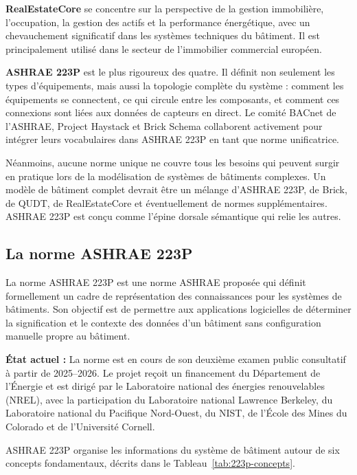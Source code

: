 \textbf{RealEstateCore} se concentre sur la perspective de la gestion immobilière, l'occupation, la gestion des actifs et la performance énergétique, avec un chevauchement significatif dans les systèmes techniques du bâtiment.
Il est principalement utilisé dans le secteur de l'immobilier commercial européen.

\textbf{ASHRAE 223P} est le plus rigoureux des quatre.
Il définit non seulement les types d'équipements, mais aussi la topologie complète du système : comment les équipements se connectent, ce qui circule entre les composants, et comment ces connexions sont liées aux données de capteurs en direct.
Le comité BACnet de l'ASHRAE, Project Haystack et Brick Schema collaborent activement pour intégrer leurs vocabulaires dans ASHRAE 223P en tant que norme unificatrice.

Néanmoins, aucune norme unique ne couvre tous les besoins qui peuvent surgir en pratique lors de la modélisation de systèmes de bâtiments complexes.
Un modèle de bâtiment complet devrait être \og un mélange d'ASHRAE 223P, de Brick, de QUDT, de RealEstateCore et éventuellement de normes supplémentaires. \fg{} ASHRAE 223P est conçu comme l'épine dorsale sémantique qui relie les autres.

\subsection{La norme ASHRAE 223P}
\label{subsec:ashrae-223p}

La norme ASHRAE 223P est une norme ASHRAE proposée qui définit formellement un cadre de représentation des connaissances pour les systèmes de bâtiments.
Son objectif est de permettre aux applications logicielles de déterminer la signification et le contexte des données d'un bâtiment sans configuration manuelle propre au bâtiment.

\textbf{État actuel :} La norme est en cours de son deuxième examen public consultatif à partir de 2025--2026.
Le projet reçoit un financement du Département de l'Énergie et est dirigé par le Laboratoire national des énergies renouvelables (NREL), avec la participation du Laboratoire national Lawrence Berkeley, du Laboratoire national du Pacifique Nord-Ouest, du NIST, de l'École des Mines du Colorado et de l'Université Cornell.

ASHRAE 223P organise les informations du système de bâtiment autour de six concepts fondamentaux, décrits dans le Tableau~\ref{tab:223p-concepts}.

